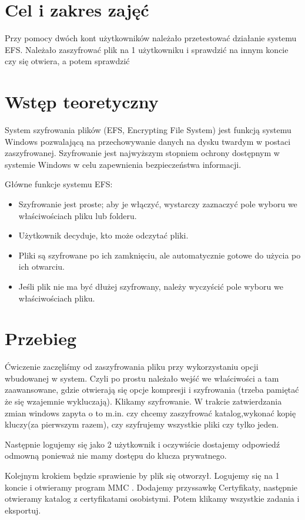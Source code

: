 \documentclass[a4paper,twoside,12pt]{mgr}
\begin{document}
\stronaTytulowa

\tableofcontents
\chapter{Cel i zakres zajęć}
Przy pomocy dwóch kont użytkowników należało przetestować działanie systemu EFS. Należało zaszyfrować plik na 1 użytkowniku i sprawdzić na innym koncie czy się otwiera, a potem sprawdzić 

\chapter{Wstęp teoretyczny}
System szyfrowania plików (EFS, Encrypting File System) jest funkcją systemu Windows pozwalającą na przechowywanie danych na dysku twardym w postaci zaszyfrowanej. Szyfrowanie jest najwyższym stopniem ochrony dostępnym w systemie Windows w celu zapewnienia bezpieczeństwa informacji.

Główne funkcje systemu EFS:
\begin{itemize}
\item Szyfrowanie jest proste; aby je włączyć, wystarczy zaznaczyć pole wyboru we właściwościach pliku lub folderu.
\item Użytkownik decyduje, kto może odczytać pliki.
\item Pliki są szyfrowane po ich zamknięciu, ale automatycznie gotowe do użycia po ich otwarciu.
\item Jeśli plik nie ma być dłużej szyfrowany, należy wyczyścić pole wyboru we właściwościach pliku.
\end{itemize}

\chapter{Przebieg}

Ćwiczenie zaczęliśmy od zaszyfrowania pliku przy wykorzystaniu opcji wbudowanej w system. Czyli po prostu należało wejść we właściwości a tam zaawansowane, gdzie otwierają się opcje kompresji i szyfrowania (trzeba pamiętać że się wzajemnie wykluczają). Klikamy szyfrowanie. W trakcie zatwierdzania zmian windows zapyta o to m.in. czy chcemy zaszyfrować katalog,wykonać kopię kluczy(za pierwszym razem), czy szyfrujemy wszystkie pliki czy tylko jeden.

Następnie logujemy się jako 2 użytkownik i oczywiście dostajemy odpowiedź odmowną ponieważ nie mamy dostępu do klucza prywatnego.

Kolejnym krokiem będzie sprawienie by plik się otworzył. Logujemy się na 1 koncie i otwieramy program MMC . Dodajemy przyssawkę Certyfikaty, następnie otwieramy katalog z certyfikatami osobistymi. Potem klikamy wszystkie zadania i eksportuj.
\end{document}

